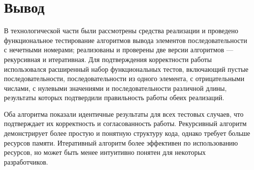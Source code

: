 \section*{Вывод}

В технологической части были рассмотрены средства реализации и проведено функциональное тестирование алгоритмов вывода элементов последовательности с нечетными номерами; реализованы и проверены две версии алгоритмов — рекурсивная и итеративная. Для подтверждения корректности работы использовался расширенный набор функциональных тестов, включающий пустые последовательности, последовательности из одного элемента, с отрицательными числами, с нулевыми значениями и последовательности различной длины, результаты которых подтвердили правильность работы обеих реализаций.

Оба алгоритма показали идентичные результаты для всех тестовых случаев, что подтверждает их корректность и согласованность работы. Рекурсивный алгоритм демонстрирует более простую и понятную структуру кода, однако требует больше ресурсов памяти. Итеративный алгоритм более эффективен по использованию ресурсов, но может быть менее интуитивно понятен для некоторых разработчиков.

\clearpage


